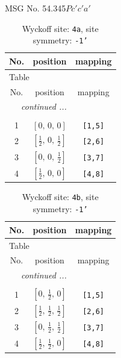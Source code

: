 \documentclass[fleqn,8pt]{jsarticle}
\begin{document}
\setcounter{MaxMatrixCols}{32}

\renewcommand{\tablename}{Table~}
\renewcommand{\figurename}{Figure~}
\begin{center}
\LARGE
MSG No. 54.345\quad$Pc'c'a'$
\end{center}
\renewcommand{\arraystretch}{1.2}
\begin{longtable}{ccc}
\caption{Wyckoff site: {\tt 4a}, site symmetry: {\tt -1'}}
 \\
 \hline \hline
No. & position & mapping \\ \hline \endfirsthead

\multicolumn{2}{l}{\tablename\ \thetable{}} \\
 \hline \hline
No. & position & mapping \\ \hline \endhead

 \hline \hline
\multicolumn{2}{r}{\footnotesize\it continued ...} \\ \endfoot

 \hline \hline
\multicolumn{2}{r}{} \\ \endlastfoot

1 & $\left[ 0,\, 0,\, 0 \right]$ & {\tt [1,5]} \\ \hline
2 & $\left[ \frac{1}{2},\, 0,\, \frac{1}{2} \right]$ & {\tt [2,6]} \\ \hline
3 & $\left[ 0,\, 0,\, \frac{1}{2} \right]$ & {\tt [3,7]} \\ \hline
4 & $\left[ \frac{1}{2},\, 0,\, 0 \right]$ & {\tt [4,8]} \\
\end{longtable}
\renewcommand{\arraystretch}{1.2}
\begin{longtable}{ccc}
\caption{Wyckoff site: {\tt 4b}, site symmetry: {\tt -1'}}
 \\
 \hline \hline
No. & position & mapping \\ \hline \endfirsthead

\multicolumn{2}{l}{\tablename\ \thetable{}} \\
 \hline \hline
No. & position & mapping \\ \hline \endhead

 \hline \hline
\multicolumn{2}{r}{\footnotesize\it continued ...} \\ \endfoot

 \hline \hline
\multicolumn{2}{r}{} \\ \endlastfoot

1 & $\left[ 0,\, \frac{1}{2},\, 0 \right]$ & {\tt [1,5]} \\ \hline
2 & $\left[ \frac{1}{2},\, \frac{1}{2},\, \frac{1}{2} \right]$ & {\tt [2,6]} \\ \hline
3 & $\left[ 0,\, \frac{1}{2},\, \frac{1}{2} \right]$ & {\tt [3,7]} \\ \hline
4 & $\left[ \frac{1}{2},\, \frac{1}{2},\, 0 \right]$ & {\tt [4,8]} \\
\end{longtable}
\end{document}
